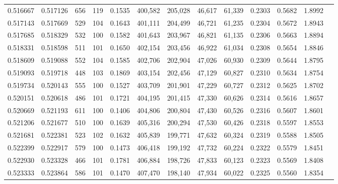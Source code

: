 \begin{tabular}{rrrrrrrrrrrrr}
0.516667 & 0.517126 &    656 &   119 &                                     0.1535 & 400,582 & 205,028 &  46,617 &  61,339 & 0.2303 & 0.5682 & 1.8992 \\
0.517143 & 0.517669 &    529 &   104 &                                     0.1643 & 401,111 & 204,499 &  46,721 &  61,235 & 0.2304 & 0.5672 & 1.8943 \\
0.517685 & 0.518329 &    532 &   100 &                                     0.1582 & 401,643 & 203,967 &  46,821 &  61,135 & 0.2306 & 0.5663 & 1.8894 \\
0.518331 & 0.518598 &    511 &   101 &                                     0.1650 & 402,154 & 203,456 &  46,922 &  61,034 & 0.2308 & 0.5654 & 1.8846 \\
0.518609 & 0.519088 &    552 &   104 &                                     0.1585 & 402,706 & 202,904 &  47,026 &  60,930 & 0.2309 & 0.5644 & 1.8795 \\
0.519093 & 0.519718 &    448 &   103 &                                     0.1869 & 403,154 & 202,456 &  47,129 &  60,827 & 0.2310 & 0.5634 & 1.8754 \\
0.519734 & 0.520143 &    555 &   100 &                                     0.1527 & 403,709 & 201,901 &  47,229 &  60,727 & 0.2312 & 0.5625 & 1.8702 \\
0.520151 & 0.520618 &    486 &   101 &                                     0.1721 & 404,195 & 201,415 &  47,330 &  60,626 & 0.2314 & 0.5616 & 1.8657 \\
0.520669 & 0.521193 &    611 &   100 &                                     0.1406 & 404,806 & 200,804 &  47,430 &  60,526 & 0.2316 & 0.5607 & 1.8601 \\
0.521206 & 0.521677 &    510 &   100 &                                     0.1639 & 405,316 & 200,294 &  47,530 &  60,426 & 0.2318 & 0.5597 & 1.8553 \\
0.521681 & 0.522381 &    523 &   102 &                                     0.1632 & 405,839 & 199,771 &  47,632 &  60,324 & 0.2319 & 0.5588 & 1.8505 \\
0.522399 & 0.522917 &    579 &   100 &                                     0.1473 & 406,418 & 199,192 &  47,732 &  60,224 & 0.2322 & 0.5579 & 1.8451 \\
0.522930 & 0.523328 &    466 &   101 &                                     0.1781 & 406,884 & 198,726 &  47,833 &  60,123 & 0.2323 & 0.5569 & 1.8408 \\
0.523333 & 0.523864 &    586 &   101 &                                     0.1470 & 407,470 & 198,140 &  47,934 &  60,022 & 0.2325 & 0.5560 & 1.8354 \\

\end{tabular}
